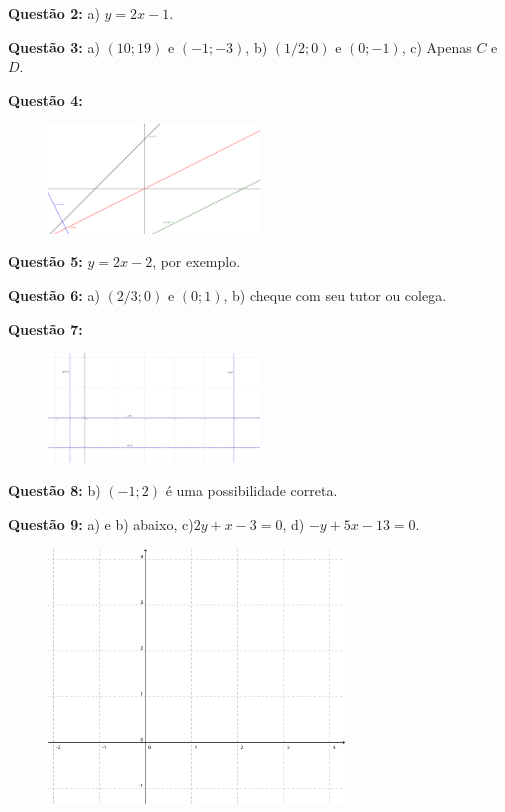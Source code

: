 \documentclass[main_estudante.tex]{subfiles}
\begin{document}
\noindent\textbf{Questão 2:} a) $y=2x-1$.

\noindent\textbf{Questão 3:} a) $(10;19)$ e $(-1;-3)$, b) $(1/2;0)$ e $(0;-1)$, c) Apenas $C$ e $D$.

\noindent\textbf{Questão 4:} 

\begin{figure}[h]
\centering
\includegraphics[width=0.5\textwidth]{./img/c6g4.png}
\end{figure}

\noindent\textbf{Questão 5:} $y=2x-2$, por exemplo.

\noindent\textbf{Questão 6:} a) $(2/3;0)$ e $(0;1)$, b) cheque com seu tutor ou colega.

\noindent\textbf{Questão 7:} 

\begin{figure}[h]
\centering
\includegraphics[width=0.5\textwidth]{./img/c6g7.png}
\end{figure}

\noindent\textbf{Questão 8:} b) $(-1;2)$ é uma possibilidade correta.

\noindent\textbf{Questão 9:} a) e b) abaixo, c)$2y+x-3=0$, d) $-y+5x-13=0$.

\begin{figure}[h]
\centering
\includegraphics[width=0.7\textwidth]{./img/c6q9.png}
\end{figure}
\end{document}
